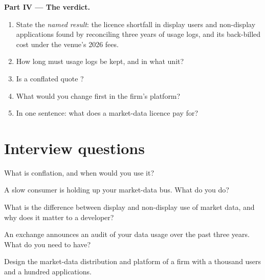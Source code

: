 \begin{problem}
\medskip\noindent\textbf{Part IV --- The verdict.}
\begin{enumerate}[resume]
\item State the \emph{named result}: the licence shortfall in display users and non-display applications found by reconciling three years of
usage logs, and its back-billed cost under the venue's 2026 fees.
\item How long must usage logs be kept, and in what unit?
\item Is a conflated quote ?
\item What would you change first in the firm's platform?
\item In one sentence: what does a market-data licence pay for?
\end{enumerate}
\end{problem}

\section{Interview questions}

\begin{interviewq}\label{iq:pl:market-data-distribution-and-entitlements:1}
What is conflation, and when would you use it?
\end{interviewq}

\begin{interviewq}\label{iq:pl:market-data-distribution-and-entitlements:2}
A slow consumer is holding up your market-data bus. What do you do?
\end{interviewq}

\begin{interviewq}\label{iq:pl:market-data-distribution-and-entitlements:3}
What is the difference between display and non-display use of market data, and why does it matter to a developer?
\end{interviewq}

\begin{interviewq}\label{iq:pl:market-data-distribution-and-entitlements:4}
An exchange announces an audit of your data usage over the past three years. What do you need to have?
\end{interviewq}

\begin{interviewq}\label{iq:pl:market-data-distribution-and-entitlements:5}
Design the market-data distribution and  platform of a firm with a thousand users and a hundred applications.
\end{interviewq}
